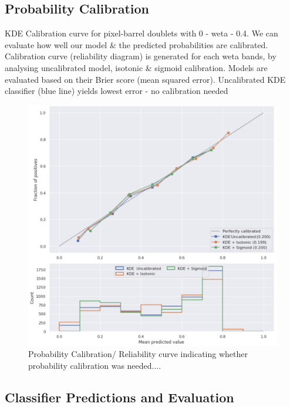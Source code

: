 \subsection{Probability Calibration}


KDE Calibration curve for pixel-barrel doublets with 0 - weta - 0.4. We can evaluate how well our model \& the predicted probabilities are calibrated. Calibration curve (reliability diagram) is generated for each weta bands, by analysing uncalibrated model, isotonic \& sigmoid calibration. Models are evaluated based on their Brier score (mean squared error). Uncalibrated KDE classifier (blue line) yields lowest error - no calibration needed

\begin{figure}[!htbp]
\centering
\includegraphics[width=0.88\linewidth]{images/4-ml-based-predictor/calibration.png}
\caption{Probability Calibration/ Reliability curve indicating whether probability calibration was needed....}
\label{fig:calibration}
\end{figure}


\subsection{Classifier Predictions and Evaluation}

